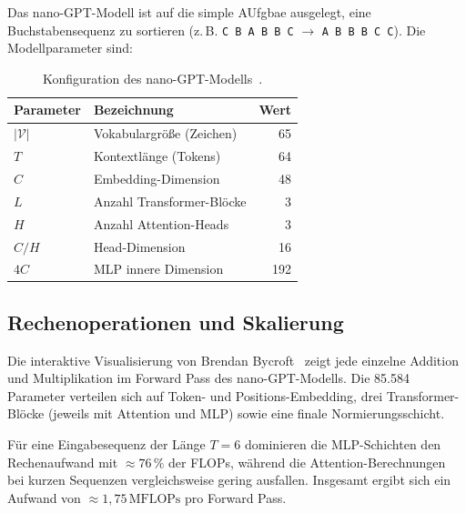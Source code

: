 Das nano-GPT-Modell ist auf die simple AUfgbae ausgelegt, eine Buchstabensequenz zu
sortieren (z.\,B. \texttt{C B A B B C} $\rightarrow$ \texttt{A B B B C C}).
Die Modellparameter sind:

\begin{table}[H]
    \centering
    \small
    \begin{tabular}{l l r}
        \toprule
        Parameter & Bezeichnung & Wert \\
        \midrule
        $|\mathcal{V}|$ & Vokabulargröße (Zeichen) & 65 \\
        $T$             & Kontextlänge (Tokens)     & 64 \\
        $C$             & Embedding-Dimension       & 48 \\
        $L$             & Anzahl Transformer-Blöcke & 3  \\
        $H$             & Anzahl Attention-Heads    & 3  \\
        $C/H$           & Head-Dimension            & 16 \\
        $4C$            & MLP innere Dimension      & 192 \\
        \bottomrule
    \end{tabular}
    \caption{Konfiguration des nano-GPT-Modells~\cite{bycroft_llm}.}
    \label{tab:nanogpt_config}
\end{table}

\subsection{Rechenoperationen und Skalierung}

Die interaktive Visualisierung von Brendan Bycroft~\cite{bycroft_llm}
zeigt jede einzelne Addition und Multiplikation im Forward Pass
des nano-GPT-Modells. Die 85.584 Parameter verteilen sich auf
Token- und Positions-Embedding, drei Transformer-Blöcke (jeweils
mit Attention und MLP) sowie eine finale Normierungsschicht.

Für eine Eingabesequenz der Länge $T = 6$ dominieren die
MLP-Schichten den Rechenaufwand mit $\approx 76\,\%$ der FLOPs,
während die Attention-Berechnungen bei kurzen Sequenzen vergleichsweise
gering ausfallen. Insgesamt ergibt sich ein Aufwand von
$\approx 1{,}75\,\text{MFLOPs}$ pro Forward Pass.

